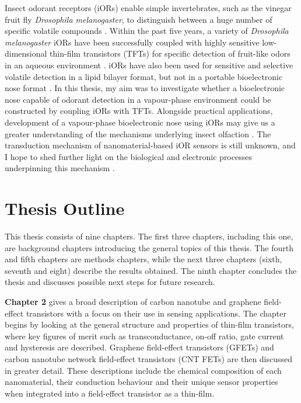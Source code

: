 \documentclass[
  a4paper,
]{scrbook}
\begin{document}
Insect odorant receptors (iORs) enable simple invertebrates, such as the
vinegar fruit fly \emph{Drosophila melanogaster}, to distinguish between
a huge number of specific volatile compounds
\autocite{Hallem2004,Smart2008,Wicher2008,Munch2016,Bohbot2020}. Within
the past five years, a variety of \emph{Drosophila melanogaster} iORs
have been successfully coupled with highly sensitive low-dimensional
thin-film transistors (TFTs) for specific detection of fruit-like odors
in an aqueous environment \autocite{Murugathas2019a,Murugathas2020}.
iORs have also been used for sensitive and selective volatile detection
in a lipid bilayer format, but not in a portable bioelectronic nose
format \autocite{Yamada2021}. In this thesis, my aim was to investigate
whether a bioelectronic nose capable of odorant detection in a
vapour-phase environment could be constructed by coupling iORs with
TFTs. Alongside practical applications, development of a vapour-phase
bioelectronic nose using iORs may give us a greater understanding of the
mechanisms underlying insect olfaction \autocite{Lee2010}. The
transduction mechanism of nanomaterial-based iOR sensors is still
unknown, and I hope to shed further light on the biological and
electronic processes underpinning this mechanism
\autocite{Murugathas2020,Khadka2019,Cheema2021}.

\hypertarget{thesis-outline}{%
\section{Thesis Outline}\label{thesis-outline}}

This thesis consists of nine chapters. The first three chapters,
including this one, are background chapters introducing the general
topics of this thesis. The fourth and fifth chapters are methods
chapters, while the next three chapters (sixth, seventh and eight)
describe the results obtained. The ninth chapter concludes the thesis
and discusses possible next steps for future research.

\textbf{Chapter 2} gives a broad description of carbon nanotube and
graphene field-effect transistors with a focus on their use in sensing
applications. The chapter begins by looking at the general structure and
properties of thin-film transistors, where key figures of merit such as
transconductance, on-off ratio, gate current and hysteresis are
described. Graphene field-effect transistors (GFETs) and carbon nanotube
network field-effect transistors (CNT FETs) are then discussed in
greater detail. These descriptions include the chemical composition of
each nanomaterial, their conduction behaviour and their unique sensor
properties when integrated into a field-effect transistor as a
thin-film.
\end{document}
